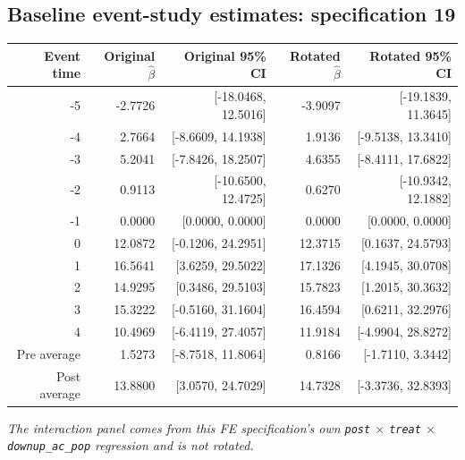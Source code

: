 \documentclass[10pt]{article}
\begin{document}
\subsection*{Baseline event-study estimates: specification 19}
\begin{center}
\scriptsize
\begin{tabular}{r rr rr}
\toprule
Event time & Original $\hat\beta$ & Original 95\% CI & Rotated $\hat\beta$ & Rotated 95\% CI \\
\midrule
-5 & -2.7726 & [-18.0468, 12.5016] & -3.9097 & [-19.1839, 11.3645] \\
-4 & 2.7664 & [-8.6609, 14.1938] & 1.9136 & [-9.5138, 13.3410] \\
-3 & 5.2041 & [-7.8426, 18.2507] & 4.6355 & [-8.4111, 17.6822] \\
-2 & 0.9113 & [-10.6500, 12.4725] & 0.6270 & [-10.9342, 12.1882] \\
-1 & 0.0000 & [0.0000, 0.0000] & 0.0000 & [0.0000, 0.0000] \\
0 & 12.0872 & [-0.1206, 24.2951] & 12.3715 & [0.1637, 24.5793] \\
1 & 16.5641 & [3.6259, 29.5022] & 17.1326 & [4.1945, 30.0708] \\
2 & 14.9295 & [0.3486, 29.5103] & 15.7823 & [1.2015, 30.3632] \\
3 & 15.3222 & [-0.5160, 31.1604] & 16.4594 & [0.6211, 32.2976] \\
4 & 10.4969 & [-6.4119, 27.4057] & 11.9184 & [-4.9904, 28.8272] \\
\midrule
Pre average & 1.5273 & [-8.7518, 11.8064] & 0.8166 & [-1.7110, 3.3442] \\
Post average & 13.8800 & [3.0570, 24.7029] & 14.7328 & [-3.3736, 32.8393] \\
\bottomrule
\end{tabular}
\end{center}
\medskip
\textit{The interaction panel comes from this FE specification's own \texttt{post} $\times$ \texttt{treat} $\times$ \texttt{downup\_ac\_pop} regression and is not rotated.}
\clearpage
\end{document}
